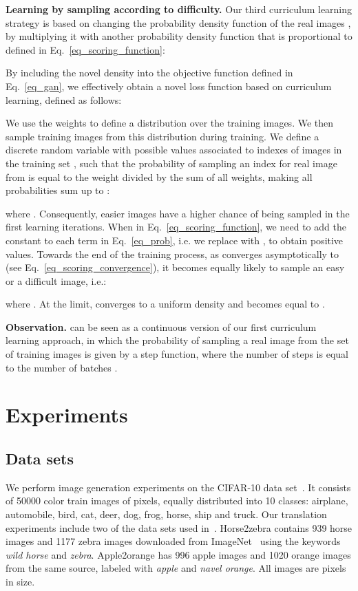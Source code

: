 \documentclass[10pt,twocolumn,letterpaper]{article}
\begin{document}
\noindent
{\bf Learning by sampling according to difficulty.}
Our third curriculum learning strategy is based on changing the probability density function of the real images , by multiplying it with another probability density function that is proportional to  defined in Eq.~\eqref{eq_scoring_function}:

By including the novel density  into the objective function  defined in Eq.~\eqref{eq_gan}, we effectively obtain a novel loss function  based on curriculum learning, defined as follows:


We use the weights  to define a distribution over the training images. We then sample training images from this distribution during training. We define a discrete random variable  with possible values associated to indexes of images in the training set , such that the probability  of sampling an index for real image  from  is equal to the weight  
divided by the sum of all weights, making all probabilities sum up to :

where . Consequently, easier images have a higher chance of being sampled in the first learning iterations. When  in Eq.~\eqref{eq_scoring_function}, we need to add the constant  to each term in Eq.~\eqref{eq_prob}, i.e. we replace  with , to obtain positive values. Towards the end of the training process, as  converges asymptotically to  (see Eq.~\eqref{eq_scoring_convergence}), it becomes equally likely to sample an easy or a difficult image, i.e.:

where . At the limit,  converges to a uniform density and  becomes equal to .

\noindent 
{\bf Observation.}  can be seen as a continuous version of our first curriculum learning approach, in which the probability of sampling a real image  from the set of training images  is given by a step function, where the number of steps is equal to the number of batches .

\vspace{-0.1cm}
\section{Experiments}
\label{sec_Experiments}
\vspace{-0.1cm}
\subsection{Data sets}
\vspace{-0.1cm}

We perform image generation experiments on the CIFAR-10 data set~\cite{Krizhevsky-TR-2009}. It consists of 50000 color train images of  pixels, equally distributed into 10 classes: airplane, automobile, bird, cat, deer, dog, frog, horse, ship and truck. Our translation experiments include two of the data sets used in~\cite{Zhu-ICCV-2017}. Horse2zebra contains 939 horse images and 1177 zebra images downloaded from ImageNet~\cite{Russakovsky2015} using the keywords \emph{wild horse} and \emph{zebra}. Apple2orange has 996 apple images and 1020 orange images from the same source, labeled with \emph{apple} and \emph{navel orange}. All images are  pixels in size.
\end{document}
